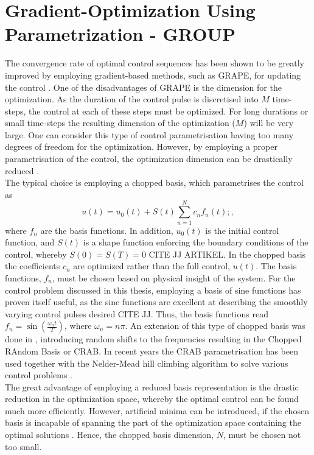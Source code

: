 \section{Gradient-Optimization Using Parametrization - GROUP}
The convergence rate of optimal control sequences has been shown to be greatly improved by employing gradient-based methods, such as GRAPE, for updating the control \cite{Jager2014}.
One of the disadvantages of GRAPE is the dimension for the optimization. As the duration of the control pulse is discretised into $M$ time-steps, the control at each of these steps must be optimized. For long durations or small time-steps the resulting dimension of the optimization ($M$) will be very large. One can consider this type of control parametrisation having too many degrees of freedom for the optimization. 
However, by employing a proper parametrisation of the control, the optimization dimension can be drastically reduced \cite{Winckel2008}.\\
The typical choice is employing a chopped basis, which parametrises the control as
\begin{equation}
	u(t) = u_0 (t) + S(t) \sum_{n=1}^{N} c_n f_n (t) ; ,
\end{equation}   
where $f_n$ are the basis functions. In addition, $u_0 (t)$ is the initial control function, and $S (t)$ is a shape function enforcing the boundary conditions of the control, whereby $S(0) = S(T) = 0$ CITE JJ ARTIKEL. In the chopped basis the coefficients $c_n$ are optimized rather than the full control, $u(t)$. The basis functions, $f_n$, must be chosen based on physical insight of the system. For the control problem discussed in this thesis, employing a basis of sine functions has proven itself useful, as the sine functions are excellent at describing the smoothly varying control pulses desired CITE JJ. Thus, the basis functions read $f_n = \sin \left( \frac{\omega_n t}{T} \right)$, where $\omega_n = n \pi$.
An extension of this type of chopped basis was done in \cite{Doria2011,Caneva2011}, introducing random shifts to the frequencies resulting in the Chopped RAndom Basis or \textsc{CRAB}. In recent years the \textsc{CRAB} parametrisation has been used together with the Nelder-Mead hill climbing algorithm to solve various control problems \cite{Doria2011,Caneva2011,FrankBloch,Lloyd2014}.\\
The great advantage of employing a reduced basis representation is the drastic reduction in the optimization space, whereby the optimal control can be found much more efficiently. However, artificial minima can be introduced, if the chosen basis is incapable of spanning the part of the optimization space containing the optimal solutions \cite{Rach2015}. Hence, the chopped basis dimension, $N$, must be chosen not too small.\\

